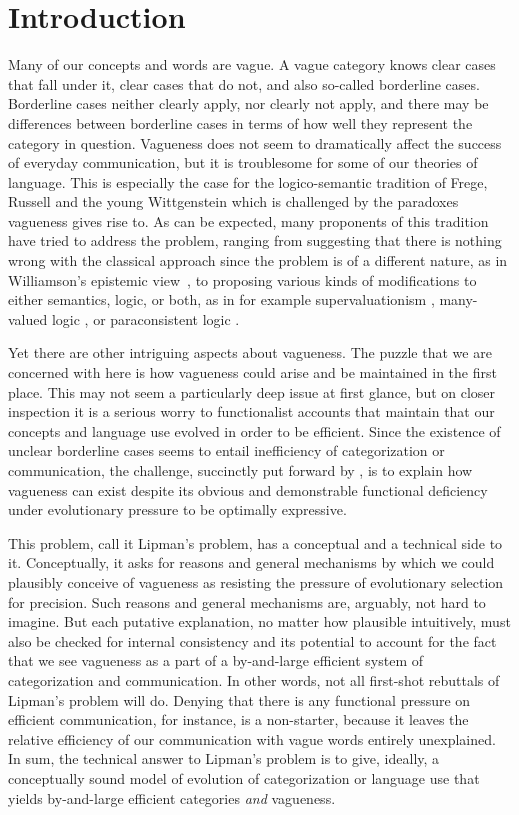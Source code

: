 \section{Introduction}

Many of our concepts and words are vague. A vague category knows clear
cases that fall under it, clear cases that do not, and also so-called
borderline cases. Borderline cases neither clearly apply, nor clearly
not apply, and there may be differences between borderline cases in
terms of how well they represent the category in question. Vagueness
does not seem to dramatically affect the success of everyday
communication, but it is troublesome for some of our theories of
language. This is especially the case for the logico-semantic
tradition of Frege, Russell and the young Wittgenstein which is
challenged by the paradoxes vagueness gives rise to. As can be
expected, many proponents of this tradition have tried to address the
problem, ranging from suggesting that there is nothing wrong with the
classical approach since the problem is of a different nature, as in
Williamson's epistemic view~\citep*{Williamson1994:Vagueness}, to
proposing various kinds of modifications to either semantics, logic,
or both, as in for example supervaluationism
\citep[e.g.][]{Mehlberg1958,Fine1975}, many-valued logic
\citep[e.g.][]{Zadeh1975,Machina1976,Edgington1997}, or paraconsistent
logic \citep[e.g.][]{CobrerosEgre2012:Tolerant-Classi}.

Yet there are other intriguing aspects about vagueness. The
puzzle that we are concerned with here is how vagueness could arise
and be maintained in the first place. This may not seem a particularly
deep issue at first glance, but on closer inspection it is a serious
worry to functionalist accounts that maintain that our concepts and
language use evolved in order to be efficient. Since the existence of
unclear borderline cases seems to entail inefficiency of
categorization or communication, the challenge, succinctly put forward
by \citet{Lipman2009:Why-is-Language}, is to explain how vagueness can
exist despite its obvious and demonstrable functional deficiency under
evolutionary pressure to be optimally expressive.

This problem, call it Lipman's problem, has a conceptual and a
technical side to it. Conceptually, it asks for reasons and general
mechanisms by which we could plausibly conceive of vagueness as
resisting the pressure of evolutionary selection for precision. Such
reasons and general mechanisms are, arguably, not hard to imagine.
But each putative explanation, no matter how plausible intuitively,
must also be checked for internal consistency and its potential to
account for the fact that we see vagueness as a part of a by-and-large
efficient system of categorization and communication. In other words,
not all first-shot rebuttals of Lipman's problem will do. Denying that
there is any functional pressure on efficient communication, for
instance, is a non-starter, because it leaves the relative efficiency
of our communication with vague words entirely unexplained. In sum,
the technical answer to Lipman's problem is to give, ideally, a
conceptually sound model of evolution of categorization or language
use that yields by-and-large efficient categories \emph{and}
vagueness.

